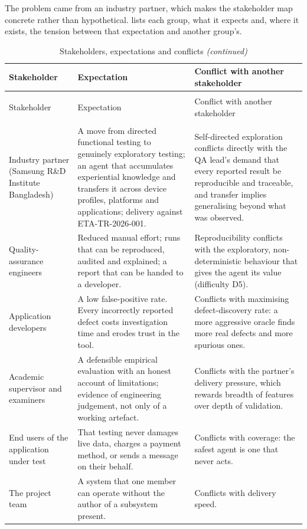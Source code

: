 The problem came from an industry partner, which makes the stakeholder map
concrete rather than hypothetical.  lists each group,
what it expects and, where it exists, the tension between that expectation and
another group's.

\begingroup
\small
\setlength{\tabcolsep}{5pt}
\begin{xltabular}{\textwidth}{@{}>{\hsize}Y>{\hsize}Y>{\hsize}Y@{}}
  \caption{Stakeholders, expectations and conflicts}
  \label{tab:stakeholders}\\
  \toprule
  Stakeholder & Expectation & Conflict with another stakeholder \\
  \midrule
  \endfirsthead
  \caption[]{Stakeholders, expectations and conflicts \emph{(continued)}}\\
  \toprule
  Stakeholder & Expectation & Conflict with another stakeholder \\
  \midrule
  \endhead
  \midrule
  \\
  \endfoot
  \bottomrule
  \endlastfoot

  Industry partner (Samsung R\&D Institute Bangladesh) & A move from directed functional testing to genuinely exploratory testing; an agent that accumulates experiential knowledge and transfers it across device profiles, platforms and applications; delivery against ETA-TR-2026-001. & Self-directed exploration conflicts directly with the QA lead's demand that every reported result be reproducible and traceable, and transfer implies generalising beyond what was observed. \\
  \addlinespace
  Quality-assurance engineers & Reduced manual effort; runs that can be reproduced, audited and explained; a report that can be handed to a developer. & Reproducibility conflicts with the exploratory, non-deterministic behaviour that gives the agent its value (difficulty D5). \\
  \addlinespace
  Application developers & A low false-positive rate. Every incorrectly reported defect costs investigation time and erodes trust in the tool. & Conflicts with maximising defect-discovery rate: a more aggressive oracle finds more real defects and more spurious ones. \\
  \addlinespace
  Academic supervisor and examiners & A defensible empirical evaluation with an honest account of limitations; evidence of engineering judgement, not only of a working artefact. & Conflicts with the partner's delivery pressure, which rewards breadth of features over depth of validation. \\
  \addlinespace
  End users of the application under test & That testing never damages live data, charges a payment method, or sends a message on their behalf. & Conflicts with coverage: the safest agent is one that never acts. \\
  \addlinespace
  The project team & A system that one member can operate without the author of a subsystem present. & Conflicts with delivery speed. \\
\end{xltabular}
\endgroup

